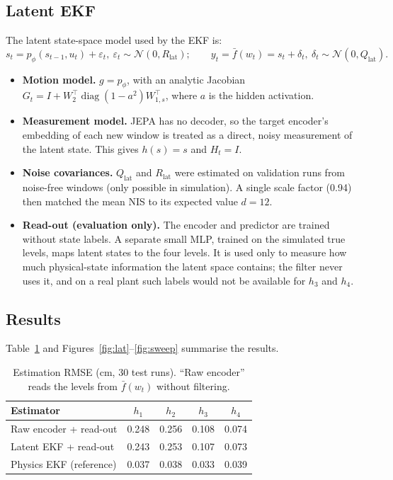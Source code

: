 \documentclass[11pt]{article}
\begin{document}
\subsection{Latent EKF}
The latent state-space model used by the EKF is:
\begin{equation}
s_t=p_\phi(s_{t-1},u_t)+\varepsilon_t,\ \varepsilon_t\sim\mathcal N(0,R_{\text{lat}});\qquad y_t=\bar f(w_t)=s_t+\delta_t,\ \delta_t\sim\mathcal N(0,Q_{\text{lat}}).
\end{equation}
\begin{itemize}\itemsep0pt
\item \textbf{Motion model.} $g=p_\phi$, with an analytic Jacobian $G_t=I+W_2^\top\operatorname{diag}(1-a^2)W_{1,s}^\top$, where $a$ is the hidden activation.
\item \textbf{Measurement model.} JEPA has no decoder, so the target encoder's embedding of each new window is treated as a direct, noisy measurement of the latent state. This gives $h(s)=s$ and $H_t=I$.
\item \textbf{Noise covariances.} $Q_{\text{lat}}$ and $R_{\text{lat}}$ were estimated on validation runs from noise-free windows (only possible in simulation). A single scale factor (0.94) then matched the mean NIS to its expected value $d=12$.
\item \textbf{Read-out (evaluation only).} The encoder and predictor are trained without state labels. A separate small MLP, trained on the simulated true levels, maps latent states to the four levels. It is used only to measure how much physical-state information the latent space contains; the filter never uses it, and on a real plant such labels would not be available for $h_3$ and $h_4$.
\end{itemize}

\subsection{Results}
Table~\ref{tab:latent} and Figures~\ref{fig:lat}--\ref{fig:sweep} summarise the results.

\begin{table}[!htbp]
\centering\small
\caption{Estimation RMSE (cm, 30 test runs). ``Raw encoder'' reads the levels from $\bar f(w_t)$ without filtering.}\label{tab:latent}
\begin{tabular}{lcccc}\toprule
Estimator & $h_1$ & $h_2$ & $h_3$ & $h_4$\\\midrule
Raw encoder + read-out & 0.248 & 0.256 & 0.108 & 0.074\\
Latent EKF + read-out & 0.243 & 0.253 & 0.107 & 0.073\\
Physics EKF (reference) & 0.037 & 0.038 & 0.033 & 0.039\\\bottomrule
\end{tabular}
\end{table}
\end{document}
